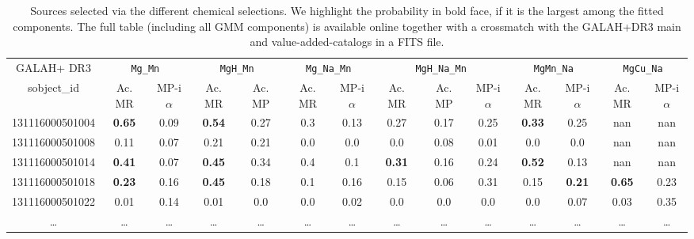 \begin{table*}
\centering
\caption{Sources selected via the different chemical selections. We highlight the probability in bold face, if it is the largest among the fitted components. The full table (including all GMM components) is available online together with a crossmatch with the GALAH+DR3 main and value-added-catalogs in a FITS file.}
\label{tab:simple_gmm_selection}
\setlength{\tabcolsep}{0.6em}
\begin{tabular}{cccccccccccccc}
\hline
GALAH+ DR3 & \multicolumn{2}{c}{\texttt{Mg\_Mn}} & \multicolumn{2}{c}{\texttt{MgH\_Mn}} & \multicolumn{2}{c}{\texttt{Mg\_Na\_Mn}} & \multicolumn{3}{c}{\texttt{MgH\_Na\_Mn}} & \multicolumn{2}{c}{\texttt{MgMn\_Na}} & \multicolumn{2}{c}{\texttt{MgCu\_Na}} \\
sobject\_id & Ac. MR & MP-i$\alpha$ & Ac. MR & Ac. MP & Ac. MR & MP-i$\alpha$ & Ac. MR & Ac. MP & MP-i$\alpha$ & Ac. MR & MP-i$\alpha$ & Ac. MR & MP-i$\alpha$ \\
\hline
131116000501004 & \textbf{0.65} & 0.09 & \textbf{0.54} & 0.27 & 0.3 & 0.13 & 0.27 & 0.17 & 0.25 & \textbf{0.33} & 0.25 & nan & nan \\
131116000501008 & 0.11 & 0.07 & 0.21 & 0.21 & 0.0 & 0.0 & 0.0 & 0.08 & 0.01 & 0.0 & 0.0 & nan & nan \\
131116000501014 & \textbf{0.41} & 0.07 & \textbf{0.45} & 0.34 & 0.4 & 0.1 & \textbf{0.31} & 0.16 & 0.24 & \textbf{0.52} & 0.13 & nan & nan \\
131116000501018 & \textbf{0.23} & 0.16 & \textbf{0.45} & 0.18 & 0.1 & 0.16 & 0.15 & 0.06 & 0.31 & 0.15 & \textbf{0.21} & \textbf{0.65} & 0.23 \\
131116000501022 & 0.01 & 0.14 & 0.01 & 0.0 & 0.0 & 0.02 & 0.0 & 0.0 & 0.0 & 0.0 & 0.07 & 0.03 & 0.35 \\
\dots  & \dots  & \dots  & \dots  & \dots  & \dots  & \dots  & \dots  & \dots  & \dots  & \dots  & \dots  & \dots  & \dots \\
\hline
\end{tabular}
\end{table*}
